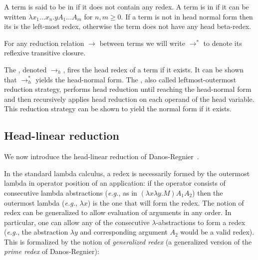 \documentclass{article}
\makeatletter
\theoremstyle{plain}
\theoremstyle{definition}
\theoremstyle{remark}
\renewcommand\eg{{\it e.g.\@\xspace}}
\makeatother
\begin{document}
A term is said to be in  if it does not contain any redex.
A term is in  if it can be written $\lambda x_1 \ldots x_n . y A_1 \ldots A_m$ for $n,m\geq0$. If a term is not in head normal form then its  is the left-most redex, otherwise the term does not have any head beta-redex.

For any reduction relation $\rightarrow$ between terms we will write
$\rightarrow^*$ to denote its reflexive transitive closure.

The , denoted $\rightarrow_{h}$, fires the head redex of a term if it exists. It can be shown that $\rightarrow^*_{h}$ yields the head-normal form. The , also called leftmost-outermost reduction strategy, performs head reduction until reaching the head-normal form and then recursively applies head reduction on each operand of the head variable. This reduction strategy can be shown to yield the normal form if it exists.


\subsection{Head-linear reduction}
We now introduce the head-linear reduction of Danos-Regnier~\cite{danos-head}.

In the standard lambda calculus, a redex is necessarily formed by the outermost lambda in operator position of an application: if the operator consists of consecutive lambda abstractions (\eg, as in $(\lambda x \lambda y . M) A_1 A_2$) then the outermost lambda (\eg, $\lambda x$) is the one that will form the redex. The notion of redex can be generalized to allow evaluation of arguments in any order. In particular, one can allow any of the consecutive $\lambda$-abstractions to form a redex (\eg, the abstraction $\lambda y$ and corresponding argument $A_2$ would be a valid redex). This is formalized by the notion of \emph{generalized redex} (a generalized version of the \emph{prime redex} of Danos-Regnier):
\end{document}
